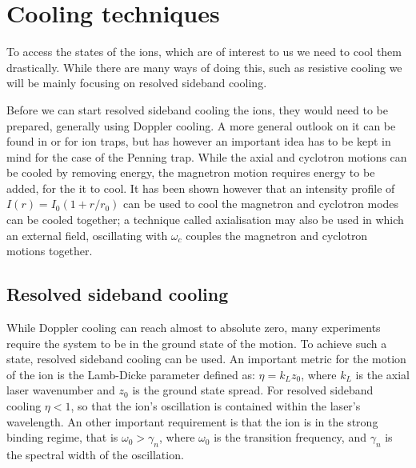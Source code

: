 \documentclass[12pt,twoside]{article}
\begin{document}
\section{Cooling techniques}
\label{Cooling}

To access the states of the ions, which are of interest to us we need to cool them drastically. While there are many ways of doing this, such as resistive cooling\cite{Cooling_techniques} we will be mainly focusing on resolved sideband cooling.

Before we can start resolved sideband cooling the ions, they would need to be prepared, generally using Doppler cooling. A more general outlook on it can be found in \cite{Foot} or \cite{Charged_Particle_traps_Cooling,Cooling_techniques} for ion traps, but has however an important idea has to be kept in mind for the case of the Penning trap. While the axial and cyclotron motions can be cooled by removing energy, the magnetron motion requires energy to be added, for the it to cool. It has been shown however that an intensity profile of $I(r) = I_0\left(1 + r/r_0\right)$ can be used to cool the magnetron and cyclotron modes can be cooled together\cite{Charged_Particle_traps_Cooling,Penning_Doppler_One_Laser}; a technique called axialisation may also be used in which an external field, oscillating with $\omega_c$ couples the magnetron and cyclotron motions together\cite{Penning_traps,Sideband_cooling_penning_trap}.

\subsection{Resolved sideband cooling}
\label{Cooling:Sideband}

While Doppler cooling can reach almost to absolute zero\cite{Foot}, many experiments require the system to be in the ground state of the motion\cite{Sideband_cooling_penning_trap,QIP_Trapped_ions}. To achieve such a state, resolved sideband cooling can be used\cite{Cooling_techniques,Ion_cooling}. An important  metric for the motion of the ion is the Lamb-Dicke parameter defined as: $\eta = k_L z_0$, where $k_L$ is the axial laser wavenumber and $z_0$ is the ground state spread\cite{Sideband_cooling_penning_trap}. For resolved sideband cooling $\eta < 1$, so that the ion's oscillation is contained within the laser's wavelength. An other important requirement is that the ion is in the strong binding regime, that is $\omega_0 > \gamma_n$, where $\omega_0$ is the transition frequency, and $\gamma_n$ is the spectral width of the oscillation\cite{Charged_Particle_traps_Cooling}.
\end{document}
